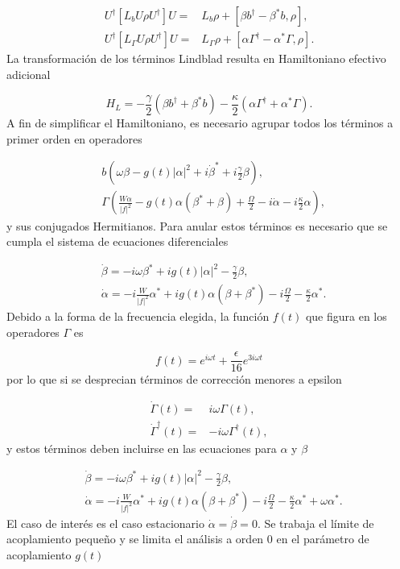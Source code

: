 \documentclass[10pt,a4paper]{report}
\begin{document}
\begin{align}
U^\dagger [L_bU\rho U^\dagger]U=& L_b\rho + [\beta b^\dagger - \beta^* b,\rho],\\
U^\dagger [L_\Gamma U\rho U^\dagger]U =& L_\Gamma \rho + [ \alpha \Gamma^\dagger - \alpha^* \Gamma,\rho].
\end{align} La transformación de los términos Lindblad resulta en  Hamiltoniano efectivo adicional

\begin{equation}
H_L = -\frac{\gamma}{2}(\beta b^\dagger + \beta^* b) -\frac{\kappa}{2}( \alpha \Gamma^\dagger + \alpha^* \Gamma).
\end{equation} A fin de simplificar el Hamiltoniano, es necesario agrupar todos los términos a primer orden en operadores

\begin{align}
&b(\omega\beta - g(t)|\alpha|^2 + i\dot{\beta}^* + i\frac{\gamma}{2}\beta),\\
&\Gamma(\frac{W\alpha}{|f|^2} -g(t)\alpha(\beta^*+\beta) + \frac{\Omega}{2}-i\dot{\alpha} - i\frac{\kappa}{2}\alpha),
\end{align} y sus conjugados Hermitianos. Para anular estos términos es necesario que se cumpla el sistema de ecuaciones diferenciales

\begin{align}
&\dot{\beta} = -i\omega\beta^* + ig(t)|\alpha|^2 - \frac{\gamma}{2}\beta,\\
&\dot{\alpha} = -i \frac{W}{|f|^2}\alpha^* + ig(t)\alpha(\beta + \beta^*) -i \frac{\Omega}{2} - \frac{\kappa}{2}\alpha^*.
\end{align} Debido a la forma de la frecuencia elegida, la función $f(t)$ que figura en los operadores $\Gamma$ es

\begin{equation}
f(t) = e^{i\omega t} + \frac{\epsilon}{16}e^{3i\omega t}
\end{equation} por lo que si se desprecian términos de corrección menores a epsilon

\begin{align}
\dot{\Gamma}(t) =& i\omega \Gamma(t),\\
\dot{\Gamma}^\dagger(t) =& -i\omega \Gamma^\dagger(t),
\end{align} y estos términos deben incluirse en las ecuaciones para $\alpha$ y $\beta$

\begin{align}
&\dot{\beta} = -i\omega\beta^* + ig(t)|\alpha|^2 - \frac{\gamma}{2}\beta,\\
&\dot{\alpha} = -i \frac{W}{|f|^2}\alpha^* + ig(t)\alpha(\beta + \beta^*) -i \frac{\Omega}{2} - \frac{\kappa}{2}\alpha^* + \omega\alpha^*.
\end{align} El caso de interés es el caso estacionario $\dot{\alpha}=\dot{\beta} = 0$. Se trabaja el límite de acoplamiento pequeño y se limita el análisis a orden 0 en el parámetro de acoplamiento $g(t)$
\end{document}
